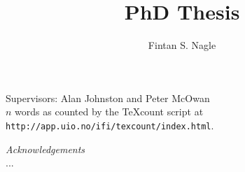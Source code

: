 \documentclass[a4paper]{article}
\title{PhD Thesis}
\author{Fintan S. Nagle}
\begin{document}
\maketitle

\begin{center}
Supervisors: Alan Johnston and Peter McOwan
\\
$n$ words as counted by  the TeXcount script at \texttt{http://app.uio.no/ifi/texcount/index.html}.
\vspace{3cm}


\vspace{3cm}

\textit{Acknowledgements}\\
...
\end{center}


\pagebreak


\tableofcontents



\pagebreak











\begin{singlespace}
\begin{footnotesize}
\begin{twocolumn}


\end{twocolumn}
\end{footnotesize}
\end{singlespace}
\newpage


\end{document}

